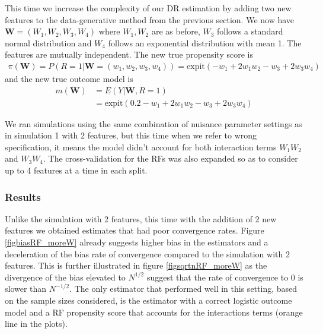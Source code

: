 \documentclass[12pt,twoside]{article}
\newcommand{\expit}{\text{expit}}
\begin{document}
This time we increase the complexity of our DR estimation by adding two new features to the data-generative method from the previous section. We now have $\mathbf{W} = (W_1,W_2,W_3,W_4)$ where $W_1,W_2$ are as before, $W_3$ follows a standard normal distribution and $W_4$ follows an exponential distribution with mean 1. The features are mutually independent. The new true propensity score is 
\begin{align*}
    \pi(\mathbf{W}) = P(R = 1 |\mathbf{W} = (w_1,w_2, w_3,w_4)) = \expit(-w_1 + 2w_1w_2 - w_3 + 2w_3w_4)
\end{align*}
and the new true outcome model is 
\begin{align*}
    m(\mathbf{W}) &= E(Y|\mathbf{W}, R=1) \\
    & = \expit(0.2 - w_1 + 2w_1w_2 - w_3 + 2w_3w_4)
\end{align*}

We ran simulations using the same combination of nuisance parameter settings as in simulation 1 with 2 features, but this time when we refer to wrong specification, it means the model didn't account for both interaction terms $W_1W_2$ and $W_3W_4$. The cross-validation for the RFs was also expanded so as to consider up to 4 features at a time in each split. 

\subsubsection*{Results}

Unlike the simulation with 2 features, this time with the addition of 2 new features we obtained estimates that had poor convergence rates. Figure \ref{figbiasRF_moreW} already suggests higher bias in the estimators and a deceleration of the bias rate of convergence compared to the simulation with 2 features. This is further illustrated in figure \ref{figsqrtnRF_moreW} as the divergence of the bias elevated to $N^{1/2}$ suggest that the rate of convergence to 0 is slower than $N^{-1/2}$. The only estimator that performed well in this setting, based on the sample sizes considered, is the estimator with a correct logistic outcome model and a RF propensity score that accounts for the interactions terms (orange line in the plots). 
\end{document}
